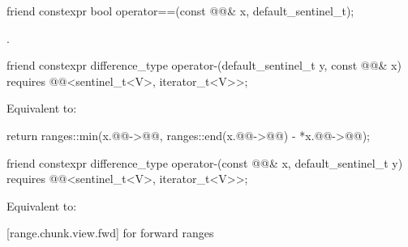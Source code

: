 \begin{itemdecl}
friend constexpr bool operator==(const @@& x, default_sentinel_t);
\end{itemdecl}

\begin{itemdescr}
\pnum
\returns
{}.
\end{itemdescr}

\begin{itemdecl}
friend constexpr difference_type operator-(default_sentinel_t y, const @@& x)
  requires @@<sentinel_t<V>, iterator_t<V>>;
\end{itemdecl}

\begin{itemdescr}
\pnum
\effects
Equivalent to:
\begin{codeblock}
return ranges::min(x.@@->@@,
                   ranges::end(x.@@->@@) - *x.@@->@@);
\end{codeblock}
\end{itemdescr}

\begin{itemdecl}
friend constexpr difference_type operator-(const @@& x, default_sentinel_t y)
  requires @@<sentinel_t<V>, iterator_t<V>>;
\end{itemdecl}

\begin{itemdescr}
\pnum
\effects
Equivalent to: 
\end{itemdescr}

[range.chunk.view.fwd]{ for forward ranges}

